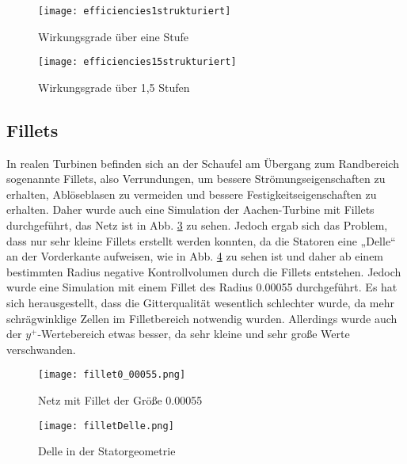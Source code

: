 \begin{figure}[H]
	\centering
	\texttt{[image: efficiencies1strukturiert]}
	\caption{Wirkungsgrade über eine Stufe} \label{fig:efficiencies1strukturiert}
\end{figure}

\begin{figure}[H]
	\centering
	\texttt{[image: efficiencies15strukturiert]}
	\caption{Wirkungsgrade über 1,5 Stufen} \label{fig:efficiencies15strukturiert}
\end{figure}


\subsection{Fillets}

In realen Turbinen befinden sich an der Schaufel am Übergang zum Randbereich sogenannte Fillets, also Verrundungen, um bessere Strömungseigenschaften zu erhalten, Ablöseblasen zu vermeiden und bessere Festigkeitseigenschaften zu erhalten. Daher wurde auch eine Simulation der Aachen-Turbine mit Fillets durchgeführt, das Netz ist in Abb. \ref{imgFillet1} zu sehen. Jedoch ergab sich das Problem, dass nur sehr kleine Fillets erstellt werden konnten, da die Statoren eine „Delle“ an der Vorderkante aufweisen, wie in Abb. \ref{imgFilletDelle} zu sehen ist und daher ab einem bestimmten Radius negative Kontrollvolumen durch die Fillets entstehen. Jedoch wurde eine Simulation mit einem Fillet des Radius 0.00055 durchgeführt. Es hat sich herausgestellt, dass die Gitterqualität wesentlich schlechter wurde, da mehr schrägwinklige Zellen im Filletbereich notwendig wurden. Allerdings wurde auch der $y^+$-Wertebereich etwas besser, da sehr kleine und sehr große Werte verschwanden.     

  \begin{figure}[H]
	\centering
	\texttt{[image: fillet0\_00055.png]}
	\caption{Netz mit Fillet der Größe 0.00055} \label{imgFillet1}
\end{figure} 

  \begin{figure}[H]
	\centering
	\texttt{[image: filletDelle.png]}
	\caption{Delle in der Statorgeometrie} \label{imgFilletDelle}
\end{figure} 